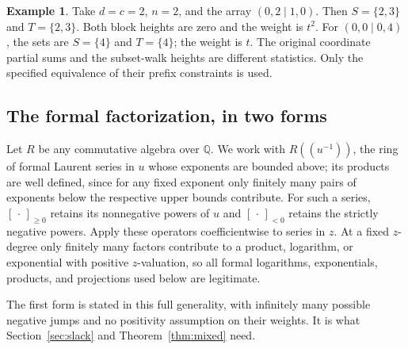 \documentclass[11pt]{article}
\numberwithin{equation}{section}
\theoremstyle{definition}
\newtheorem{example}[theorem]{Example}
\newcommand{\Q}{\mathbb Q}
\begin{document}
\begin{example}
Take $d=c=2$, $n=2$, and the array $(0,2\mid1,0)$. Then
$S=\{2,3\}$ and $T=\{2,3\}$. Both block heights are zero and the weight is
$t^2$. For $(0,0\mid0,4)$, the sets are $S=\{4\}$ and $T=\{4\}$; the
weight is $t$. The original coordinate partial sums and the subset-walk
heights are different statistics. Only the specified equivalence of their
prefix constraints is used.
\end{example}

\subsection{The formal factorization, in two forms}
\label{sec:factorization}
Let $R$ be any commutative algebra over $\Q$. We work with
$R((u^{-1}))$, the ring of formal Laurent series in $u$ whose exponents are
bounded above; its products are well defined, since for any fixed exponent
only finitely many pairs of exponents below the respective upper bounds
contribute. For such a series, $[\,\cdot\,]_{\geq0}$ retains its nonnegative
powers of $u$ and $[\,\cdot\,]_{<0}$ retains the strictly negative powers.
Apply these operators coefficientwise to series in $z$. At a fixed $z$-degree
only finitely many factors contribute to a product, logarithm, or exponential
with positive $z$-valuation, so all formal logarithms, exponentials,
products, and projections used below are legitimate.

The first form is stated in this full generality, with infinitely many
possible negative jumps and no positivity assumption on their weights. It is
what Section~\ref{sec:slack} and Theorem~\ref{thm:mixed} need.
\end{document}
